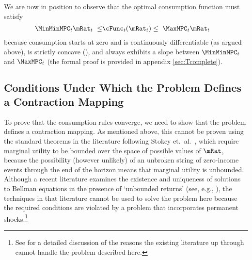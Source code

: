\documentclass[BufferStockTheory]{subfiles}
\begin{document}
\hypertarget{cBounds}{}
We are now in position to observe that the optimal consumption function must satisfy
\begin{align}
  \MinMinMPC_{t} \mRat_{t} ~ \leq &   \cFunc_{t}(\mRat_{t})  \leq  ~ \MaxMPC_{t} \mRat_{t} \label{eq:cBounds}
\end{align}
because consumption starts at zero and is continuously differentiable (as argued above), is strictly concave (\cite{ckConcavity}), and always exhibits a slope between $\MinMinMPC_{t}$ and $\MaxMPC_{t}$ (the formal proof is provided in appendix \ref{sec:Tcomplete}).


\begin{comment}
  If the \FHWC~does not hold, we make do with a less useful bound on the minimal MPC: It is
  weakly greater than zero, which follows from the logic in
  \ref{sec:cExists}; hence the `max' in \eqref{eq:MinMinMPCDef}.
\end{comment}

\hypertarget{Conditions-Under-Which-the-Problem-Defines-a-Contraction-Mapping}{}
\subsection{Conditions Under Which the Problem Defines a Contraction Mapping}

\label{subsec:contraction}

To prove that the consumption rules converge, we need to show that the
problem defines a contraction mapping. As mentioned above, this cannot be proven using the
standard theorems in the literature following Stokey et.\ al.~\citeyearpar{slpMethods},
which require marginal utility to be bounded over the space of
possible values of $\mRat$, because the possibility (however unlikely)
of an unbroken string of zero-income events through the end of the horizon means that marginal utility is unbounded.
Although a recent literature examines the existence and uniqueness 
of solutions to Bellman equations in the presence of `unbounded returns' (see, e.g.,
\cite{mnUnique}), the techniques in that literature
cannot be used to solve the problem here because the required conditions 
are violated by a problem that incorporates permanent shocks.\footnote{See \cite{yaoNote}
  for a detailed discussion of the reasons the existing literature up through \cite{mnUnique} cannot handle 
  the problem described here.}
\end{document}
